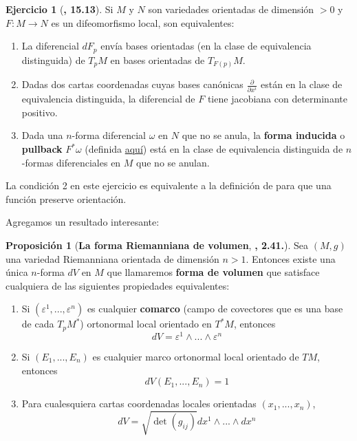 \documentclass[spanish]{book}
\theoremstyle{definition}
\newtheorem*{prop}{Proposición}
\newtheorem*{ejer*}{Ejercicio}
\begin{document}
	\begin{ejer*}[\cite{Lee}\textbf{, 15.13}]
		Si $M$ y $N$ son variedades orientadas de dimensión $>0$ y ${F:M\to N}$ es un difeomorfismo local, son equivalentes:
		\begin{enumerate}
			\item La diferencial $dF_p$ envía bases orientadas (en la clase de equivalencia distinguida) de $T_pM$ en bases orientadas de $T_{F(p)}M$.
			\item Dadas dos cartas coordenadas cuyas bases canónicas $\frac{\partial}{\partial x^i}$ están en la clase de equivalencia distinguida, la diferencial de $F$ tiene jacobiana con determinante positivo.
			\item Dada una $n$-forma diferencial $\omega$ en $N$ que no se anula, la \textbf{forma inducida} o \textbf{pullback} $F^*\omega$ (definida \hyperref[pullback]{aquí}) está en la clase de equivalencia distinguida de $n$-formas diferenciales en $M$ que no se anulan.
		\end{enumerate}
	\end{ejer*}
	
	La condición 2 en este ejercicio es equivalente a la definición de \cite{DoCarmo} para que una función preserve orientación.
	
	Agregamos un resultado interesante:
	\begin{prop}[\textbf{La forma Riemanniana de volumen}, \cite{Lee-riem}\textbf{, 2.41.}]
		
		Sea $(M,g)$ una variedad Riemanniana orientada de dimensión $n>1$. Entonces existe una única $n$-forma $dV$ en $M$ que llamaremos \textbf{forma de volumen} que satisface cualquiera de las siguientes propiedades equivalentes:
		
		\begin{enumerate}[label={(\arabic*)}]
			\item Si $(\varepsilon^1,...,\varepsilon^n)$ es cualquier \textbf{comarco} (campo de covectores que es una base de cada $T_pM^*$) ortonormal local orientado en $T^*M$, entonces
			\[dV=\varepsilon^1\wedge...\wedge\varepsilon^n\]
			\item Si $(E_1,...,E_n)$ es cualquier marco ortonormal local orientado de $TM$, entonces
			\[dV(E_1,...,E_n)=1\]
			\item Para cualesquiera cartas coordenadas locales orientadas $(x_1,...,x_n)$,
			$$dV=\sqrt{\det (g_{ij})}dx^1\wedge...\wedge dx^n$$
		\end{enumerate}
	\end{prop}
	
\end{document}
